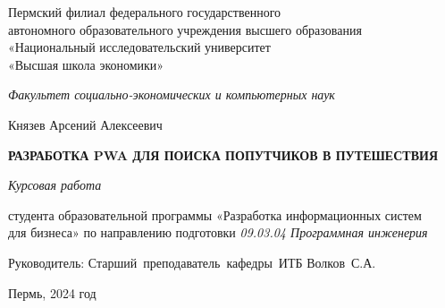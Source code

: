 \begin{titlepage}
    \newpage
    \begin{center}
        {Пермский филиал федерального государственного \\
            автономного образовательного учреждения высшего образования \\
            «Национальный исследовательский университет \\
        «Высшая школа экономики»}
        \vspace{0.5cm}

        \textit{Факультет социально-экономических и компьютерных наук}
        \vspace{5cm}

        Князев Арсений Алексеевич
        \vspace{0.5cm}

        \uppercase{{\bfseries разработка pwa для поиска попутчиков в путешествия}}
        \vspace{0.5cm}

        \textit{Курсовая работа}
        \vspace{0.5cm}

        студента образовательной программы «Разработка информационных систем \\
        для бизнеса» по направлению подготовки \textit{09.03.04 Программная инженерия}
        \vspace{3cm}

        \vbox{%
            \hfill%
            \vbox{%
                \hbox{Руководитель:}%
                \hbox{Старший преподаватель кафедры ИТБ}
                \hbox{Волков С.А.}%
            }%
        }

        \vspace{\fill}
        \begin{center}
            Пермь, 2024 год
        \end{center}

    \end{center}
\end{titlepage}
